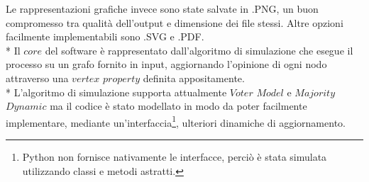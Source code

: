 \documentclass{article}
\begin{document}
Le rappresentazioni grafiche invece sono state salvate in .PNG, un buon compromesso tra qualità dell'output e dimensione dei file stessi. Altre opzioni facilmente implementabili sono .SVG e .PDF.\\*
Il $core$ del software è rappresentato dall'algoritmo di simulazione che esegue il processo su un grafo fornito in input, aggiornando l'opinione di ogni nodo attraverso una $vertex$ $property$ definita appositamente.\\*
L'algoritmo di simulazione supporta attualmente $Voter$ $Model$ e $Majority$ $Dynamic$ ma il codice è stato modellato in modo da poter facilmente implementare, mediante un'interfaccia\footnote{Python non fornisce nativamente le interfacce, perciò è stata simulata utilizzando classi e metodi astratti.}, ulteriori dinamiche di aggiornamento.
\end{document}

